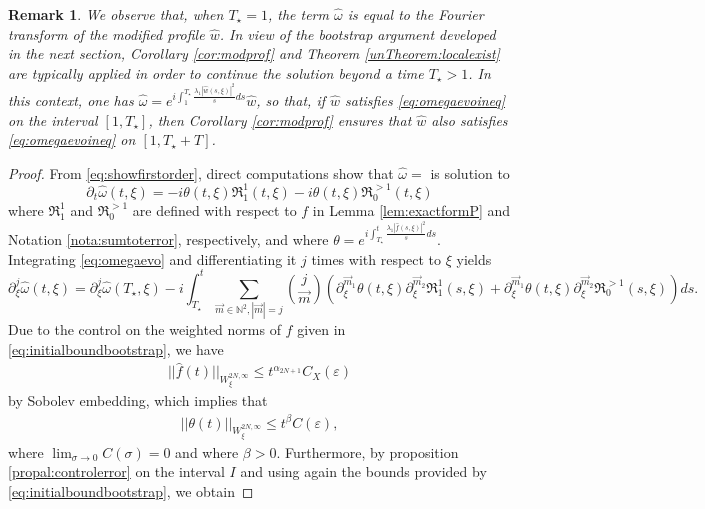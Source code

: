 \documentclass[a4paper, 15pt]{article}
\numberwithin{equation}{section}
\newtheorem{rem}[defi]{Remark}
\begin{document}
\begin{rem}
\label{rem:usecor}
We observe that, when $T_\star=1$, the term $\hat{\omega}$ is equal to the Fourier transform of the modified profile $\hat{w}$. 
In view of the bootstrap argument developed in the next section, Corollary \ref{cor:modprof} and Theorem \ref{unTheorem:localexist} are typically applied in order to continue the solution beyond a time $T_\star>1$. In this context, one has $\hat{\omega}=e^{i\int^{T_\star}_{1}\frac{\lambda_1|\hat{w}(s,\xi)|^2}{s}ds}\hat{w}$, so that, if $\hat{w}$ satisfies \eqref{eq:omegaevoineq} on the interval $[1,T_\star]$, then Corollary \ref{cor:modprof} ensures that $\hat{w}$ also satisfies \eqref{eq:omegaevoineq} on $[1,T_\star+T]$.
\end{rem}
\begin{proof}
From \eqref{eq:showfirstorder}, direct computations show that $\hat{\omega}=$ is solution to  
\begin{equation}
\label{eq:omegaevo}
    \partial_t\hat{\omega}(t,\xi)=-i\theta(t,\xi)\mathfrak{R}^1_1(t,\xi)-i\theta(t,\xi)\mathfrak{R}^{>1}_0(t,\xi)
\end{equation}
where $\mathfrak{R}^1_1$ and $\mathfrak{R}^{>1}_0$ are defined with respect to $f$ in Lemma \ref{lem:exactformP} and Notation \ref{nota:sumtoterror}, respectively, and where $\theta=e^{i\int^t_{T_\star}\frac{\lambda_1|\hat{f}(s,\xi)|^2}{s}ds}$. Integrating \eqref{eq:omegaevo} and differentiating it $j$ times with respect to $\xi$ yields
\begin{equation}
\label{eq:modifprofilelocal}
  \partial_\xi^j\hat{\omega}(t,\xi)= \partial_\xi^j\hat{\omega}(T_\star,\xi)-i\int^t_{T_\star}\sum_{\overrightarrow{m}\in\mathbb{N}^{2}, |\overrightarrow{m}|=j}\binom{j}{\overrightarrow{m}}\left(\partial_\xi^{\overrightarrow{m}_1}\theta(t,\xi)\partial_\xi^{\overrightarrow{m}_2}\mathfrak{R}^1_{1}(s,\xi)+\partial_\xi^{\overrightarrow{m}_1}\theta(t,\xi)\partial_\xi^{\overrightarrow{m}_2}\mathfrak{R}^{>1}_0(s,\xi)\right)ds.
\end{equation}
Due to the control on the weighted norms of $f$ given in \eqref{eq:initialboundbootstrap}, we have
\begin{align*}
||\hat{f}(t)||_{W^{2N,\infty}_\xi}\leq t^{\alpha_{2N+1}}C_X(\varepsilon)
\end{align*} 
by Sobolev embedding, which implies that 
\begin{align*}
||\theta(t)||_{W^{2N,\infty}_\xi}\leq t^{\beta}C(\varepsilon),
\end{align*}
where $\lim_{\sigma\to0}C(\sigma)=0$ and where $\beta>0$. Furthermore, by proposition \ref{propal:controlerror} on the interval $I$ and using again the bounds provided by \eqref{eq:initialboundbootstrap}, we obtain 

\end{proof}
\end{document}
